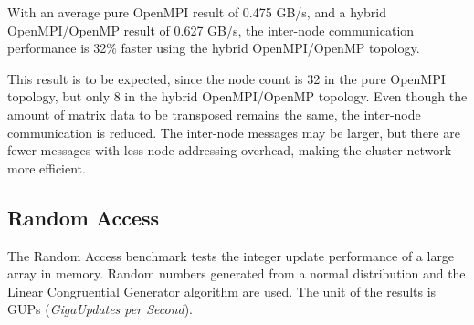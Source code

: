With an average pure OpenMPI result of 0.475 GB/s, and a hybrid OpenMPI/OpenMP result of 0.627 GB/s, the inter-node communication performance is 32\% faster using the hybrid OpenMPI/OpenMP topology.

This result is to be expected, since the node count is 32 in the pure OpenMPI topology, but only 8 in the hybrid OpenMPI/OpenMP topology. Even though the amount of matrix data to be transposed remains the same, the inter-node communication is reduced. The inter-node messages may be larger, but there are fewer messages with less node addressing overhead, making the cluster network more efficient. 


%
%
\subsection{Random Access}

The Random Access benchmark tests the integer update performance of a large array in memory. Random numbers generated from a normal distribution and the Linear Congruential Generator algorithm are used. The unit of the results is GUPs (\emph{GigaUpdates per Second}).

